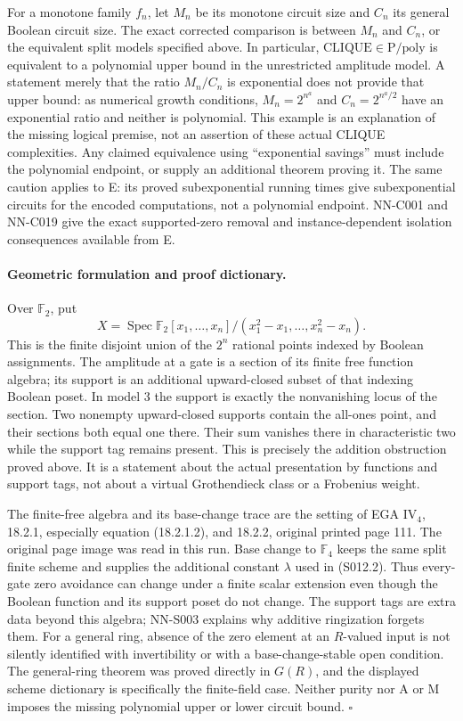 For a monotone family $f_n$, let $M_n$ be its monotone circuit size
and $C_n$ its general Boolean circuit size. The exact corrected
comparison is between $M_n$ and $C_n$, or the equivalent split models
specified above. In particular, $\mathrm{CLIQUE}\in\mathrm P/\mathrm{poly}$
is equivalent to a polynomial upper bound in the unrestricted amplitude
model. A statement merely that the ratio $M_n/C_n$ is exponential
does not provide that upper bound: as numerical growth conditions,
$M_n=2^{n^a}$ and $C_n=2^{n^a/2}$ have an exponential ratio and neither
is polynomial. This example is an explanation of the missing logical
premise, not an assertion of these actual CLIQUE complexities.
Any claimed equivalence using ``exponential savings'' must include
the polynomial endpoint, or supply an additional theorem proving it.
The same caution applies to E: its proved subexponential running times
give subexponential circuits for the encoded computations, not a
polynomial endpoint. NN-C001 and NN-C019 give the exact supported-zero
removal and instance-dependent isolation consequences available from E.

\paragraph{Geometric formulation and proof dictionary.}
Over $\mathbb F_2$, put
\[
 X=\operatorname{Spec}
 \mathbb F_2[x_1,\ldots,x_n]/(x_1^2-x_1,\ldots,x_n^2-x_n).
\]
This is the finite disjoint union of the $2^n$ rational points indexed
by Boolean assignments. The amplitude at a gate is a section of its
finite free function algebra; its support is an additional upward-closed
subset of that indexing Boolean poset. In model 3 the support is exactly
the nonvanishing locus of the section. Two nonempty upward-closed
supports contain the all-ones point, and their sections both equal one
there. Their sum vanishes there in characteristic two while the support
tag remains present. This is precisely the addition obstruction proved
above. It is a statement about the actual presentation by functions and
support tags, not about a virtual Grothendieck class or a Frobenius weight.

The finite-free algebra and its base-change trace are the setting of
EGA IV$_4$, 18.2.1, especially equation (18.2.1.2), and 18.2.2,
original printed page 111. The original page image was read in this
run. Base change to $\mathbb F_4$ keeps the same split finite scheme
and supplies the additional constant $\lambda$ used in (S012.2).
Thus every-gate zero avoidance can change under a finite scalar
extension even though the Boolean function and its support poset do
not change. The support tags are extra data beyond this algebra;
NN-S003 explains why additive ringization forgets them. For a general
ring, absence of the zero element at an $R$-valued input is not
silently identified with invertibility or with a base-change-stable
open condition. The general-ring theorem was proved directly in
$G(R)$, and the displayed scheme dictionary is specifically the
finite-field case. Neither purity nor A or M imposes the missing
polynomial upper or lower circuit bound.
\hfill$\square$

